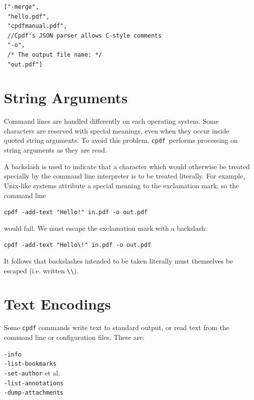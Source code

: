 \documentclass{book}
\newcommand{\cpdf}{\texttt{cpdf}}
\begin{document}
\begin{framed}
{\small\begin{verbatim}
["-merge",
 "hello.pdf",
 "cpdfmanual.pdf",
 //Cpdf's JSON parser allows C-style comments
 "-o",
 /* The output file name: */
 "out.pdf"]
\end{verbatim}}\end{framed}

\section{String Arguments}
Command lines are handled differently on each operating system. Some
characters are reserved with special meanings, even when they occur inside
quoted string arguments. To avoid this problem, \cpdf\ performs processing on
string arguments as they are read.

A backslash is used to indicate that a character which would otherwise be
treated specially by the command line interpreter is to be treated literally. For
example, Unix-like systems attribute a special meaning to the exclamation mark, so
the command line
\begin{framed}
 \noindent\small\verb?cpdf -add-text "Hello!" in.pdf -o out.pdf?
\end{framed}
\noindent would fail. We must escape the exclamation mark with a backslash:
\begin{framed}
 \noindent\small\verb?cpdf -add-text "Hello\!" in.pdf -o out.pdf?
\end{framed}
\noindent It follows that backslashes intended to be taken literally must themselves be
escaped (i.e. written \verb!\\!).

\section{Text Encodings}
\label{textencodings}

Some \texttt{cpdf} commands write text to standard output, or read text from
the command line or configuration files. These are:

\begin{framed}
  \noindent\small\verb!-info!\\
  \noindent\small\verb!-list-bookmarks!\\
  \noindent\small\verb!-set-author! et al.\\
  \noindent\small\verb!-list-annotations!\\
  \noindent\small\verb!-dump-attachments!
\end{framed}
\end{document}
